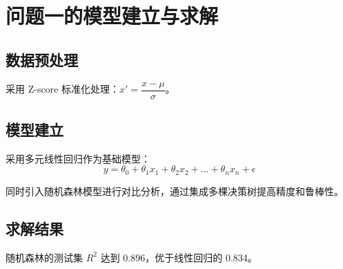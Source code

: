 \section{问题一的模型建立与求解}

\subsection{数据预处理}

采用 Z-score 标准化处理：$x' = \dfrac{x - \mu}{\sigma}$。

\subsection{模型建立}

采用多元线性回归作为基础模型：
\begin{equation}
y = \theta_0 + \theta_1 x_1 + \theta_2 x_2 + \dots + \theta_n x_n + \epsilon
  \label{eq:5-problem1-1}
\end{equation}

同时引入随机森林模型进行对比分析，通过集成多棵决策树提高精度和鲁棒性。

\subsection{求解结果}

随机森林的测试集 $R^2$ 达到 0.896，优于线性回归的 0.834。
